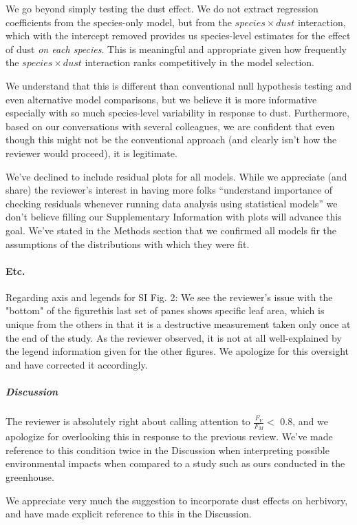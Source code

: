 \documentclass[parskip=half]{scrartcl}
\begin{document}
We go beyond simply testing the dust effect. 
We do not extract regression coefficients from the species-only model, but from the $species \times dust$ interaction, which with the intercept removed provides us species-level estimates for the effect of dust \emph{on each species}. 
This is meaningful and appropriate given how frequently the $species \times dust$ interaction ranks competitively in the model selection. 

We understand that this is different than conventional null hypothesis testing and even alternative model comparisons, but we believe it is more informative especially with so much species-level variability in response to dust. 
Furthermore, based on our conversations with several colleagues, we are confident that even though this might not be the conventional approach (and clearly isn't how the reviewer would proceed), it is legitimate. 

We've declined to include residual plots for all models. 
While we appreciate (and share) the reviewer's interest in  having more folks ``understand importance of checking residuals whenever running data analysis using statistical models'' we don't believe filling our Supplementary Information with plots will advance this goal. 
We've stated in the Methods section that we confirmed all models fir the assumptions of the distributions with which they were fit. 

\paragraph{Etc.} 

Regarding axis and legends for SI Fig. 2: We see the reviewer's issue with the "bottom" of the figure\textemdash this last set of panes shows specific leaf area, which is unique from the others in that it is a destructive measurement taken only once at the end of the study. 
As the reviewer observed, it is not at all well-explained by the legend information given for the other figures. 
We apologize for this oversight and have corrected it accordingly. 


\subparagraph{Discussion} 
The reviewer is absolutely right about calling attention to $\frac{F_{V}}{F_{M}} <$ 0.8, and we apologize for overlooking this in response to the previous review. 
We've made reference to this condition twice in the Discussion when interpreting possible environmental impacts when compared to a study such as ours conducted in the greenhouse. 

We appreciate very much the suggestion to incorporate dust effects on herbivory, and have made explicit reference to this in the Discussion. 
\end{document}
